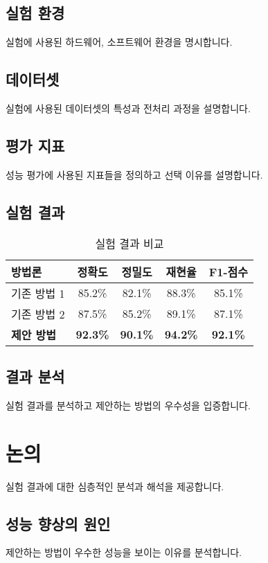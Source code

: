 \documentclass[12pt,a4paper]{article}
\begin{document}
\subsection{실험 환경}
실험에 사용된 하드웨어, 소프트웨어 환경을 명시합니다.

\subsection{데이터셋}
실험에 사용된 데이터셋의 특성과 전처리 과정을 설명합니다.

\subsection{평가 지표}
성능 평가에 사용된 지표들을 정의하고 선택 이유를 설명합니다.

\subsection{실험 결과}
\begin{table}[htbp]
\centering
\caption{실험 결과 비교}
\label{tab:results}
\begin{tabular}{@{}lcccc@{}}
\toprule
방법론 & 정확도 & 정밀도 & 재현율 & F1-점수 \\
\midrule
기존 방법 1 & 85.2\% & 82.1\% & 88.3\% & 85.1\% \\
기존 방법 2 & 87.5\% & 85.2\% & 89.1\% & 87.1\% \\
\textbf{제안 방법} & \textbf{92.3\%} & \textbf{90.1\%} & \textbf{94.2\%} & \textbf{92.1\%} \\
\bottomrule
\end{tabular}
\end{table}

\subsection{결과 분석}
실험 결과를 분석하고 제안하는 방법의 우수성을 입증합니다.

\section{논의}
\label{sec:discussion}

실험 결과에 대한 심층적인 분석과 해석을 제공합니다.

\subsection{성능 향상의 원인}
제안하는 방법이 우수한 성능을 보이는 이유를 분석합니다.
\end{document}
